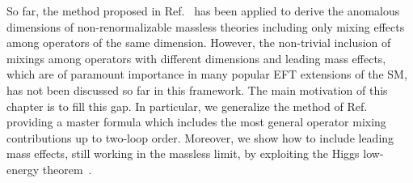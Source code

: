 So far, the method proposed in Ref.~\cite{Caron-Huot:2016cwu} has been applied to derive the
anomalous dimensions of non-renormalizable massless theories including only mixing effects among
operators of the same dimension. However, the non-trivial inclusion of mixings among operators with
different dimensions and leading mass effects, which are of paramount importance in many popular EFT
extensions of the SM, has not been discussed so far in this framework. The main motivation of this
chapter is to fill this gap. In particular, we generalize the method of
Ref.~\cite{Caron-Huot:2016cwu} providing a master formula which includes the most general operator
mixing contributions up to two-loop order. Moreover, we show how to include leading mass effects,
still working in the massless limit, by exploiting the Higgs low-energy
theorem~\cite{Ellis:1975ap,Shifman:1979eb,Shadmi:2018xan,Durieux:2019eor,Durieux:2020gip,%
Balkin:2021dko,Bertuzzo:2023slg}.

